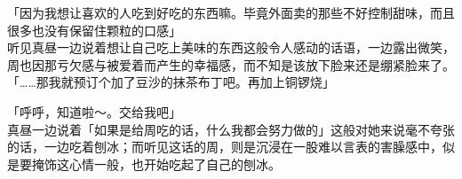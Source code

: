 「因为我想让喜欢的人吃到好吃的东西嘛。毕竟外面卖的那些不好控制甜味，而且很多也没有保留住颗粒的口感」\\

听见真昼一边说着想让自己吃上美味的东西这般令人感动的话语，一边露出微笑，周也因那亏欠感与被爱着而产生的幸福感，而不知是该放下脸来还是绷紧脸来了。\\

「……那我就预订个加了豆沙的抹茶布丁吧。再加上铜锣烧」

「呼呼，知道啦～。交给我吧」\\

真昼一边说着「如果是给周吃的话，什么我都会努力做的」这般对她来说毫不夸张的话，一边吃着刨冰；而听见这话的周，则是沉浸在一股难以言表的害臊感中，似是要掩饰这心情一般，也开始吃起了自己的刨冰。
